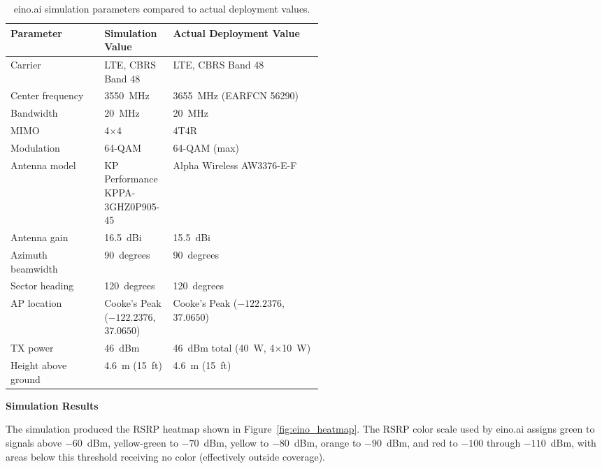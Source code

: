 \documentclass[
    left=1.5in,
    right=1.25in,
    top=1.25in,
    bottom=1.25in
]{CalPolySeniorProject}
\begin{document}
\begin{table}[!ht]
    \centering
    \caption[eino.ai simulation parameters]{eino.ai simulation parameters
    compared to actual deployment values.}
    \vspace{0.5\baselineskip}
    \begin{tabularx}{\linewidth}{p{0.30\linewidth}p{0.22\linewidth}X}
        \toprule
        \textbf{Parameter} & \textbf{Simulation Value}
            & \textbf{Actual Deployment Value} \\
        \midrule
        Carrier          & LTE, CBRS Band 48 & LTE, CBRS Band 48 \\
        \addlinespace
        Center frequency & 3550~MHz & 3655~MHz (EARFCN 56290) \\
        \addlinespace
        Bandwidth        & 20~MHz & 20~MHz \\
        \addlinespace
        MIMO             & 4$\times$4 & 4T4R \\
        \addlinespace
        Modulation       & 64-QAM & 64-QAM (max) \\
        \addlinespace
        Antenna model    & KP Performance KPPA-3GHZ0P905-45
                         & Alpha Wireless AW3376-E-F \\
        \addlinespace
        Antenna gain     & 16.5~dBi & 15.5~dBi \\
        \addlinespace
        Azimuth beamwidth & 90~degrees & 90~degrees \\
        \addlinespace
        Sector heading   & 120~degrees & 120~degrees \\
        \addlinespace
        AP location      & Cooke's Peak ($-122.2376$, $37.0650$)
                         & Cooke's Peak ($-122.2376$, $37.0650$) \\
        \addlinespace
        TX power         & 46~dBm & 46~dBm total (40~W, 4$\times$10~W) \\
        \addlinespace
        Height above ground & 4.6~m (15~ft) & 4.6~m (15~ft) \\
        \bottomrule
    \end{tabularx}
    \label{tab:simsettings}
\end{table}

\textbf{Simulation Results}

The simulation produced the RSRP heatmap shown in Figure~\ref{fig:eino_heatmap}.
The RSRP color scale used by eino.ai assigns green to signals above $-60$~dBm,
yellow-green to $-70$~dBm, yellow to $-80$~dBm, orange to $-90$~dBm, and red
to $-100$ through $-110$~dBm, with areas below this threshold receiving no color
(effectively outside coverage).
\end{document}
